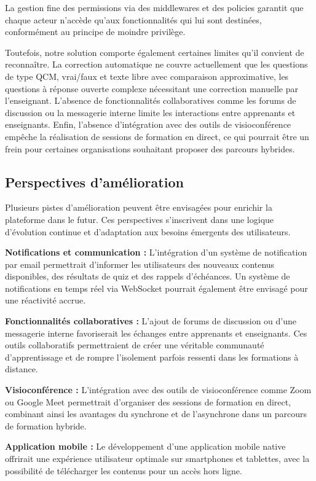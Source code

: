 \documentclass[12pt,a4paper]{report}
\begin{document}
La gestion fine des permissions via des middlewares et des policies garantit que chaque acteur n'accède qu'aux fonctionnalités qui lui sont destinées, conformément au principe de moindre privilège.

Toutefois, notre solution comporte également certaines limites qu'il convient de reconnaître. La correction automatique ne couvre actuellement que les questions de type QCM, vrai/faux et texte libre avec comparaison approximative, les questions à réponse ouverte complexe nécessitant une correction manuelle par l'enseignant. L'absence de fonctionnalités collaboratives comme les forums de discussion ou la messagerie interne limite les interactions entre apprenants et enseignants. Enfin, l'absence d'intégration avec des outils de visioconférence empêche la réalisation de sessions de formation en direct, ce qui pourrait être un frein pour certaines organisations souhaitant proposer des parcours hybrides.

\subsection*{Perspectives d'amélioration}
Plusieurs pistes d'amélioration peuvent être envisagées pour enrichir la plateforme dans le futur. Ces perspectives s'inscrivent dans une logique d'évolution continue et d'adaptation aux besoins émergents des utilisateurs.

\textbf{Notifications et communication :} L'intégration d'un système de notification par email permettrait d'informer les utilisateurs des nouveaux contenus disponibles, des résultats de quiz et des rappels d'échéances. Un système de notifications en temps réel via WebSocket pourrait également être envisagé pour une réactivité accrue.

\textbf{Fonctionnalités collaboratives :} L'ajout de forums de discussion ou d'une messagerie interne favoriserait les échanges entre apprenants et enseignants. Ces outils collaboratifs permettraient de créer une véritable communauté d'apprentissage et de rompre l'isolement parfois ressenti dans les formations à distance.

\textbf{Visioconférence :} L'intégration avec des outils de visioconférence comme Zoom ou Google Meet permettrait d'organiser des sessions de formation en direct, combinant ainsi les avantages du synchrone et de l'asynchrone dans un parcours de formation hybride.

\textbf{Application mobile :} Le développement d'une application mobile native offrirait une expérience utilisateur optimale sur smartphones et tablettes, avec la possibilité de télécharger les contenus pour un accès hors ligne.
\end{document}
